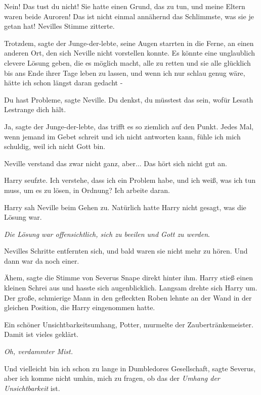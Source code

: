 \glqq{}Nein! Das tust du nicht! Sie hatte einen Grund, das zu tun, und meine
Eltern waren beide Auroren! Das ist nicht einmal annähernd das Schlimmste, was
sie je getan hat!\grqq{} Nevilles Stimme zitterte.

\glqq{}Trotzdem\grqq{}, sagte der Junge-der-lebte, seine Augen starrten in die
Ferne, an einen anderen Ort, den sich Neville nicht vorstellen konnte. \glqq{}Es
könnte eine unglaublich clevere Lösung geben, die es möglich macht, alle zu
retten und sie alle glücklich bis ans Ende ihrer Tage leben zu lassen, und wenn
ich nur schlau genug wäre, hätte ich schon längst daran gedacht -\grqq{}

\glqq{}Du hast Probleme\grqq{}, sagte Neville. \glqq{}Du denkst, du müsstest das
sein, wofür Lesath Lestrange dich hält.\grqq{}

\glqq{}Ja\grqq{}, sagte der Junge-der-lebte, \glqq{}das trifft es so ziemlich
auf den Punkt. Jedes Mal, wenn jemand im Gebet schreit und ich nicht antworten
kann, fühle ich mich schuldig, weil ich nicht Gott bin.\grqq{}

Neville verstand das zwar nicht ganz, aber... \glqq{}Das hört sich nicht gut
an.\grqq{}

Harry seufzte. \glqq{}Ich verstehe, dass ich ein Problem habe, und ich weiß, was
ich tun muss, um es zu lösen, in Ordnung? Ich arbeite daran.\grqq{}

Harry sah Neville beim Gehen zu. Natürlich hatte Harry nicht gesagt, was die
Lösung war.

\emph{Die Lösung war offensichtlich, sich zu beeilen und Gott zu werden}.

Nevilles Schritte entfernten sich, und bald waren sie nicht mehr zu hören. Und
dann war da noch einer.

\glqq{}Ähem\grqq{}, sagte die Stimme von Severus Snape direkt hinter ihm. Harry
stieß einen kleinen Schrei aus und hasste sich augenblicklich. Langsam drehte
sich Harry um. Der große, schmierige Mann in den gefleckten Roben lehnte an der
Wand in der gleichen Position, die Harry eingenommen hatte.

\glqq{}Ein schöner Unsichtbarkeitsumhang, Potter\grqq{}, murmelte der
Zaubertränkemeister. \glqq{}Damit ist vieles geklärt.\grqq{}

\emph{Oh, verdammter Mist.}

\glqq{}Und vielleicht bin ich schon zu lange in Dumbledores Gesellschaft\grqq{},
sagte Severus, \glqq{}aber ich komme nicht umhin, mich zu fragen, ob das der
\emph{Umhang der Unsichtbarkeit} ist.\grqq{}

